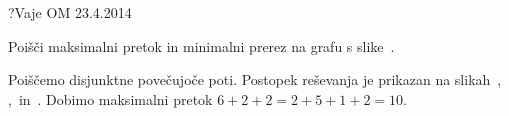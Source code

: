 \begin{naloga}{?}{Vaje OM 23.4.2014}
\begin{vprasanje}
Poišči maksimalni pretok in minimalni prerez na grafu s slike~\fig.

\begin{slika}
\pgfslika
{}
\end{slika}
\end{vprasanje}

\begin{odgovor}
Poiščemo disjunktne povečujoče poti.
Postopek reševanja je prikazan na slikah~,~%
,~ in~.
Dobimo maksimalni pretok $6+2+2 = 2+5+1+2 = 10$.

\begin{slika}
\end{slika}
\begin{slika}
\end{slika}
\begin{slika}
\end{slika}
\begin{slika}
\end{slika}
\end{odgovor}
\end{naloga}
